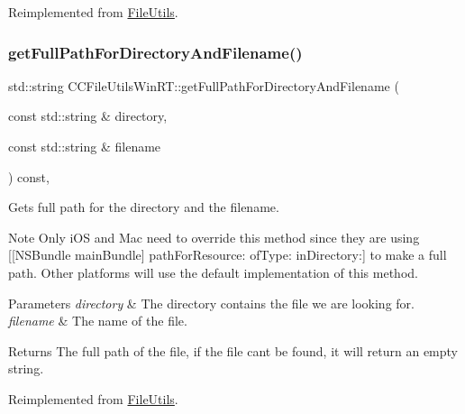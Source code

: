 Reimplemented from \hyperlink{classFileUtils_a1804c928fb8897e07e181a8e72362e0a}{File\+Utils}.

\mbox{\label{classCCFileUtilsWinRT_ab72a708f0159e1d0929053540421a2df}} 
\subsubsection{\texorpdfstring{get\+Full\+Path\+For\+Directory\+And\+Filename()}{getFullPathForDirectoryAndFilename()}}
{\footnotesize\ttfamily std\+::string C\+C\+File\+Utils\+Win\+R\+T\+::get\+Full\+Path\+For\+Directory\+And\+Filename (\begin{DoxyParamCaption}\item[{const std\+::string \&}]{directory,  }\item[{const std\+::string \&}]{filename }\end{DoxyParamCaption}) const\hspace{0.3cm}{\ttfamily [override]}, {\ttfamily [virtual]}}

Gets full path for the directory and the filename.

\begin{DoxyNote}{Note}
Only i\+OS and Mac need to override this method since they are using {\ttfamily \mbox{[}\mbox{[}N\+S\+Bundle main\+Bundle\mbox{]} path\+For\+Resource\+: of\+Type\+: in\+Directory\+:\mbox{]}} to make a full path. Other platforms will use the default implementation of this method. 
\end{DoxyNote}

\begin{DoxyParams}{Parameters}
{\em directory} & The directory contains the file we are looking for. \\
\hline
{\em filename} & The name of the file. \\
\hline
\end{DoxyParams}
\begin{DoxyReturn}{Returns}
The full path of the file, if the file can\textquotesingle{}t be found, it will return an empty string. 
\end{DoxyReturn}


Reimplemented from \hyperlink{classFileUtils_a543d684dc27fc7d02fbe387271d92c12}{File\+Utils}.

